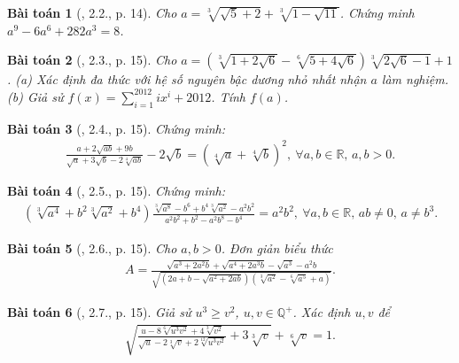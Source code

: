 \documentclass{article}
\newtheorem{baitoan}{Bài toán}
\begin{document}
\begin{baitoan}[\cite{TLCT_THCS_Toan_9_dai_so}, 2.2., p. 14]
	Cho $a = \sqrt[3]{\sqrt{5} + 2} + \sqrt[3]{1 - \sqrt{11}}$. Chứng minh $a^9 - 6a^6 + 282a^3 = 8$.
\end{baitoan}

\begin{baitoan}[\cite{TLCT_THCS_Toan_9_dai_so}, 2.3., p. 15]
	Cho $a = (\sqrt[3]{1 + 2\sqrt{6}} - \sqrt[6]{5 + 4\sqrt{6}})\sqrt[3]{2\sqrt{6} - 1} + 1$. (a) Xác định đa thức với hệ số nguyên bậc dương nhỏ nhất nhận $a$ làm nghiệm. (b) Giả sử $f(x) = \sum_{i=1}^{2012} ix^i + 2012$. Tính $f(a)$.
\end{baitoan}

\begin{baitoan}[\cite{TLCT_THCS_Toan_9_dai_so}, 2.4., p. 15]
	Chứng minh:
	\begin{align*}
		\frac{a + 2\sqrt{ab} + 9b}{\sqrt{a} + 3\sqrt{b} - 2\sqrt[4]{ab}} - 2\sqrt{b} = \left(\sqrt[4]{a} + \sqrt[4]{b}\right)^2,\ \forall a,b\in\mathbb{R},\,a,b > 0.
	\end{align*}
\end{baitoan}

\begin{baitoan}[\cite{TLCT_THCS_Toan_9_dai_so}, 2.5., p. 15]
	Chứng minh:
	\begin{align*}
		\left(\sqrt[3]{a^4} + b^2\sqrt[3]{a^2} + b^4\right)\frac{\sqrt[3]{a^8} - b^6 + b^4\sqrt[3]{a^2} - a^2b^2}{a^2b^2 + b^2 - a^2b^8 - b^4} = a^2b^2,\ \forall a,b\in\mathbb{R},\,ab\ne0,\,a\ne b^3.
	\end{align*}
\end{baitoan}

\begin{baitoan}[\cite{TLCT_THCS_Toan_9_dai_so}, 2.6., p. 15]
	Cho $a,b > 0$. Đơn giản biểu thức
	\begin{align*}
		A = \frac{\sqrt{a^3 + 2a^2b} + \sqrt{a^4 + 2a^3b} - \sqrt{a^3} - a^2b}{\sqrt{\left(2a + b - \sqrt{a^2 + 2ab}\right)\left(\sqrt[3]{a^2} - \sqrt[6]{a^5} + a\right)}}.
	\end{align*}
\end{baitoan}

\begin{baitoan}[\cite{TLCT_THCS_Toan_9_dai_so}, 2.7., p. 15]
	Giả sử $u^3\ge v^2$, $u,v\in\mathbb{Q}^+$. Xác định $u,v$ để
	\begin{align*}
		\sqrt{\frac{u - 8\sqrt[6]{u^3v^2} + 4\sqrt[3]{v^2}}{\sqrt{u} - 2\sqrt[3]{v} + 2\sqrt[12]{u^3v^2}} + 3\sqrt[3]{v}} + \sqrt[6]{v} = 1.
	\end{align*}
\end{baitoan}
\end{document}
